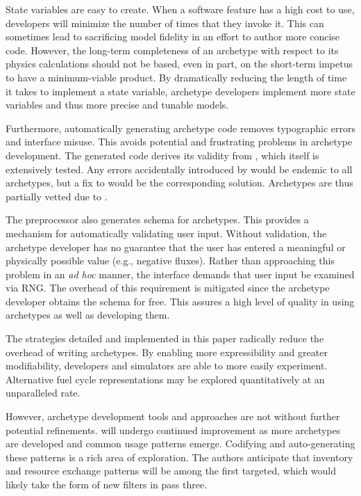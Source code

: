 State variables are easy to create. When a software feature has a high cost to use,
developers will minimize the number of times that they invoke it. This can
sometimes lead to sacrificing model fidelity in an effort to author more concise
code. However, the long-term completeness of an archetype
with respect to its physics calculations should not be based, even in part, on the
short-term impetus to have a minimum-viable product. By dramatically reducing the
length of time it takes to implement a state variable, archetype developers implement
more state variables and thus more precise and tunable models.

Furthermore, automatically generating archetype code removes typographic errors and
\cyclus interface misuse. This avoids potential and frustrating problems in
archetype development. The
generated code derives its validity from \cycpp, which itself is extensively
tested. Any errors accidentally introduced by \cycpp would be endemic to all archetypes,
but a fix to \cycpp would be the corresponding solution. Archetypes are thus
partially vetted due to \cycpp.

The preprocessor also generates schema for archetypes. This provides a mechanism
for automatically validating user input.  Without validation, the archetype
developer has no guarantee that the user has entered a meaningful or physically possible
value (e.g., negative fluxes). Rather than approaching this problem in an
\emph{ad hoc}
manner, the \cyclus interface demands that user input be examined via \gls{RNG}.  The overhead
of this requirement is mitigated since the archetype developer obtains the schema
for free. This assures a high level of quality in using archetypes as well as
developing them.

The strategies detailed and implemented in this paper radically
reduce the overhead of writing archetypes. By enabling more expressibility and greater
modifiability, developers and simulators are able to more easily experiment.
Alternative fuel cycle representations may be explored quantitatively at an
unparalleled rate.

However, archetype development tools and approaches are not without further
potential refinements. \cycpp will undergo continued improvement
as more archetypes are developed and common usage patterns emerge. Codifying and
auto-generating these patterns is a rich area of exploration. The authors anticipate
that inventory and resource exchange patterns will be among the first
targeted,
which would likely take the form of new filters in pass three.

